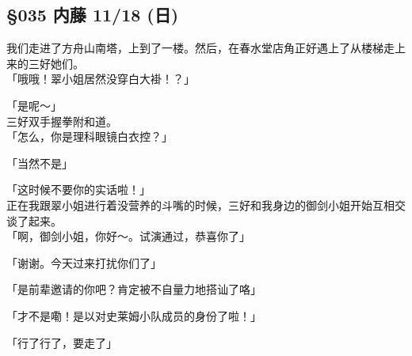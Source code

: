 \subsection{§035 内藤 11/18 (日)}

我们走进了方舟山南塔，上到了一楼。然后，在春水堂店角正好遇上了从楼梯走上来的三好她们。\\

「哦哦！翠小姐居然没穿白大褂！？」

「是呢～」\\

三好双手握拳附和道。\\

「怎么，你是理科眼镜白衣控？」

「当然不是」

「这时候不要你的实话啦！」\\

正在我跟翠小姐进行着没营养的斗嘴的时候，三好和我身边的御剑小姐开始互相交谈了起来。\\

「啊，御剑小姐，你好～。试演通过，恭喜你了」

「谢谢。今天过来打扰你们了」

「是前辈邀请的你吧？肯定被不自量力地搭讪了咯」

「才不是嘞！是以对史莱姆小队成员的身份了啦！」

「行了行了，要走了」\\

